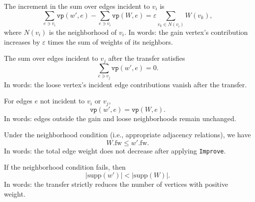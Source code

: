 \begin{lemma}
    \label{lem:Improve_gain_contribution_increase}
The increment in the sum over edges incident to \(v_i\) is
\[
\sum_{e \ni v_i} \texttt{vp}(w', e) - \sum_{e \ni v_i} \texttt{vp}(W, e) = \varepsilon \sum_{v_k \in N(v_i)} W(v_k),
\]
where \(N(v_i)\) is the neighborhood of \(v_i\).
In words: the gain vertex's contribution increases by \(\varepsilon\) times the sum of weights of its neighbors.
\end{lemma}

\begin{lemma}
    \label{lem:Improve_loose_contribution_zero}
The sum over edges incident to \(v_j\) after the transfer satisfies
\[
\sum_{e \ni v_j} \texttt{vp}(w', e) = 0.
\]
In words: the loose vertex's incident edge contributions vanish after the transfer.
\end{lemma}

\begin{lemma}
    \label{lem:Improve_unchanged_edge_sum}
For edges \(e\) not incident to \(v_i\) or \(v_j\),
\[
\texttt{vp}(w', e) = \texttt{vp}(W, e).
\]
In words: edges outside the gain and loose neighborhoods remain unchanged.
\end{lemma}

\begin{lemma}
    \label{lem:Improve_total_weight_nondec}
Under the neighborhood condition (i.e., appropriate adjacency relations), we have
\[
W.\mathrm{fw} \leq w'.\mathrm{fw}.
\]
In words: the total edge weight does not decrease after applying \texttt{Improve}.
\end{lemma}

\begin{lemma}
    \label{lem:Improve_support_strictly_reduced}
If the neighborhood condition fails, then
\[
|\mathrm{supp}(w')| < |\mathrm{supp}(W)|.
\]
In words: the transfer strictly reduces the number of vertices with positive weight.
\end{lemma}


